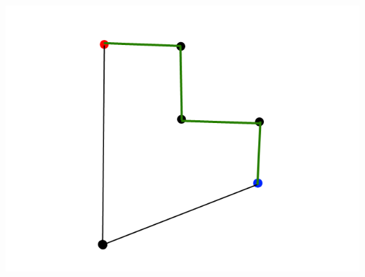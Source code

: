 \documentclass[a4paper,12pt]{article}
\begin{document}
\centerline{\includegraphics[scale=0.5]{dij3.png}} \hspace*{\fill} \\
\end{document}
